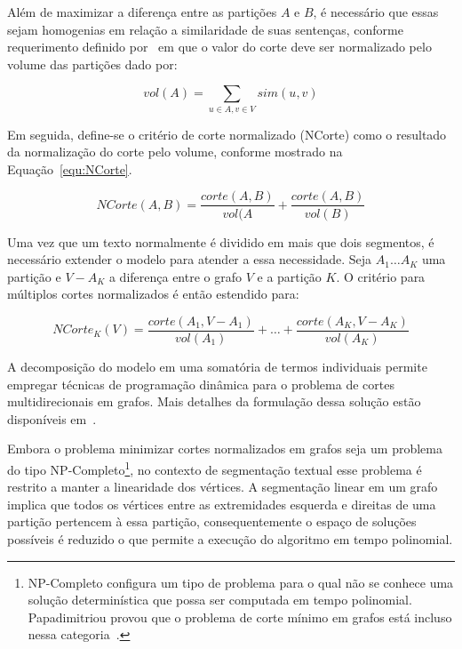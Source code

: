Além de maximizar a diferença entre as partições $A$ e $B$, é necessário que essas sejam homogenias em relação a similaridade de suas sentenças, conforme requerimento definido por~\cite{Shi2000} em que o valor do corte deve ser normalizado pelo volume das partições dado por:

\begin{equation}
	vol(A) = \sum_{u \in A, v \in V} sim(u, v)
\end{equation}


Em seguida, define-se o critério de corte normalizado (NCorte) como o resultado da normalização do corte pelo volume, conforme mostrado na Equação~\ref{equ:NCorte}.

\begin{equation}
	NCorte(A,B) = \frac{corte(A,B)}{vol(A} + \frac{corte(A,B)}{vol(B)}
	\label{equ:NCorte}
\end{equation}


Uma vez que um texto normalmente é dividido em mais que dois segmentos, é necessário extender o modelo para atender a essa necessidade. Seja $A_1 \dots A_K$ uma partição e $V - A_K$ a diferença entre o grafo $V$ e a partição $K$. O critério para múltiplos cortes normalizados é então estendido para: 

\begin{equation} 
	NCorte_K(V) = \frac{corte(A_1, V-A_1)}{vol(A_1)} + \dots + \frac{corte(A_K, V-A_K)}{vol(A_K)} 
	\label{equ:NCorte-k}
\end{equation}


A decomposição do modelo em uma somatória de termos individuais permite empregar técnicas de programação dinâmica para o problema de cortes multidirecionais em grafos. Mais detalhes da formulação dessa solução estão disponíveis em~\cite{Malioutov:2006a}.

Embora o problema minimizar cortes normalizados em grafos seja um problema do tipo NP-Completo\footnote{NP-Completo configura um tipo de problema para o qual não se conhece uma solução determinística que possa ser computada em tempo polinomial. Papadimitriou provou que o problema de corte mínimo em grafos está incluso nessa categoria~\cite{Monien1988, Papadimitriou1976}.}, no contexto de segmentação textual esse problema é restrito a manter a linearidade dos vértices. A segmentação linear em um grafo implica que todos os vértices entre as extremidades esquerda e direitas de uma partição pertencem à essa partição, consequentemente o espaço de soluções possíveis é reduzido o que permite a execução do algoritmo em tempo polinomial.  


















 
